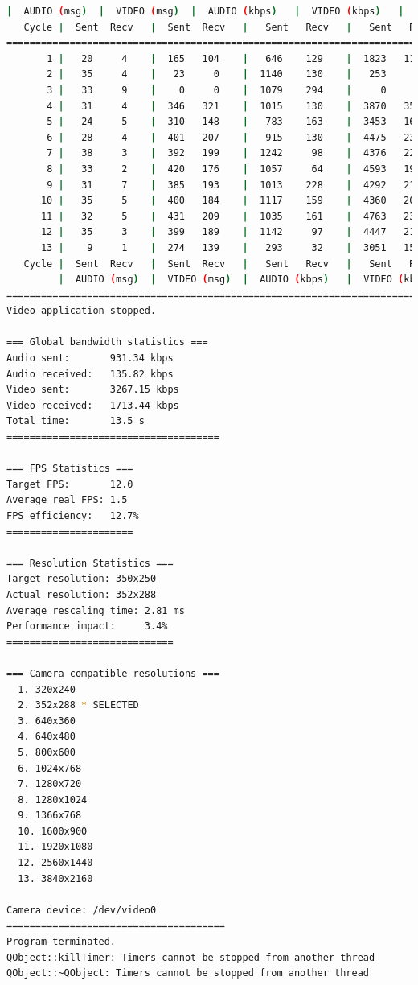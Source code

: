 \begin{lstlisting}[language=bash,basicstyle=\ttfamily\tiny]
         |  AUDIO (msg)  |  VIDEO (msg)  |  AUDIO (kbps)   |  VIDEO (kbps)   |     CPU (%) 
   Cycle |  Sent  Recv   |  Sent  Recv   |   Sent   Recv   |   Sent   Recv   | Program System
================================================================================================
       1 |   20     4    |  165   104    |   646    129    |  1823   1146    |  20      0       
       2 |   35     4    |   23     0    |  1140    130    |   253      0    |  48     74       
       3 |   33     9    |    0     0    |  1079    294    |     0      0    |  63     74       
       4 |   31     4    |  346   321    |  1015    130    |  3870   3592    |  38     75       
       5 |   24     5    |  310   148    |   783    163    |  3453   1648    |  44     69       
       6 |   28     4    |  401   207    |   915    130    |  4475   2308    |  45     70       
       7 |   38     3    |  392   199    |  1242     98    |  4376   2224    |  57     72       
       8 |   33     2    |  420   176    |  1057     64    |  4593   1921    |  26     67       
       9 |   31     7    |  385   193    |  1013    228    |  4292   2155    |  24     70       
      10 |   35     5    |  400   184    |  1117    159    |  4360   2005    |  16     61       
      11 |   32     5    |  431   209    |  1035    161    |  4763   2312    |  15     63       
      12 |   35     3    |  399   189    |  1142     97    |  4447   2106    |  20     64       
      13 |    9     1    |  274   139    |   293     32    |  3051   1548    |  10     58       
   Cycle |  Sent  Recv   |  Sent  Recv   |   Sent   Recv   |   Sent   Recv   | Program System
         |  AUDIO (msg)  |  VIDEO (msg)  |  AUDIO (kbps)   |  VIDEO (kbps)   |     CPU (%) 
===========================================================================================
Video application stopped.

=== Global bandwidth statistics ===
Audio sent:       931.34 kbps
Audio received:   135.82 kbps
Video sent:       3267.15 kbps
Video received:   1713.44 kbps
Total time:       13.5 s
=====================================

=== FPS Statistics ===
Target FPS:       12.0
Average real FPS: 1.5
FPS efficiency:   12.7%
======================

=== Resolution Statistics ===
Target resolution: 350x250
Actual resolution: 352x288
Average rescaling time: 2.81 ms
Performance impact:     3.4%
=============================

=== Camera compatible resolutions ===
  1. 320x240
  2. 352x288 * SELECTED
  3. 640x360
  4. 640x480
  5. 800x600
  6. 1024x768
  7. 1280x720
  8. 1280x1024
  9. 1366x768
  10. 1600x900
  11. 1920x1080
  12. 2560x1440
  13. 3840x2160

Camera device: /dev/video0
======================================
Program terminated.
QObject::killTimer: Timers cannot be stopped from another thread
QObject::~QObject: Timers cannot be stopped from another thread
\end{lstlisting}

